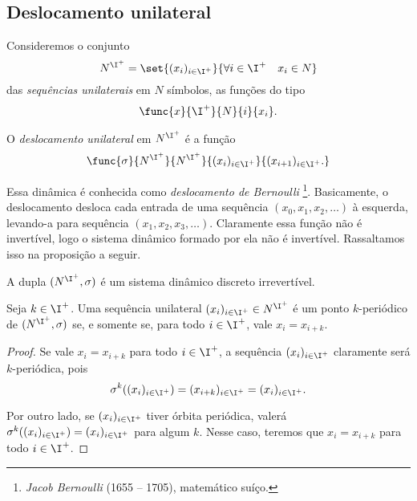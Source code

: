 \subsection{Deslocamento unilateral}

Consideremos o conjunto
	\begin{equation*}
	N^{\I^+} = \set{(x_i)_{i \in \I^+}}{\forall i \in \I^+ \quad x_i \in N}
	\end{equation*}
das \emph{sequências unilaterais} em $N$ símbolos, as funções do tipo
	\begin{align*}
	\func{x}{\I^+}{N}{i}{x_i}.
	\end{align*}

\begin{definition}
O \emph{deslocamento unilateral} em $N^{\I^+}$ é a função
	\begin{align*}
	\func{\sigma}{N^{\I^+}}{N^{\I^+}}{(x_i)_{i \in \I^+}}{(x_{i+1})_{i \in \I^+}.}
	\end{align*}
\end{definition}

 Essa dinâmica é conhecida como \emph{deslocamento de Bernoulli} \footnote{\emph{Jacob Bernoulli} (1655 -- 1705), matemático suíço.}. Basicamente, o deslocamento desloca cada entrada de uma sequência $(x_0,x_1,x_2,\ldots)$ à esquerda, levando-a para sequência $(x_1,x_2,x_3,\ldots)$. Claramente essa função não é invertível, logo o sistema dinâmico formado por ela não é invertível. Rassaltamos isso na proposição a seguir.

\begin{proposition}
A dupla $(N^{\I^+},\sigma)$ é um sistema dinâmico discreto irrevertível.
\end{proposition}

\begin{proposition}
Seja $k \in \I^+$. Uma sequência unilateral $(x_i)_{i \in \I^+} \in N^{\I^+}$ é um ponto $k$-periódico de $(N^{\I^+},\sigma)$  se, e somente se, para todo $i \in \I^+$, vale $x_i = x_{i+k}$.
\end{proposition}
\begin{proof}
Se vale $x_i = x_{i+k}$ para todo $i \in \I^+$, a sequência $(x_i)_{i \in \I^+}$ claramente será $k$-periódica, pois
	\begin{equation*}
	\sigma^k((x_i)_{i \in \I^+}) = (x_{i+k})_{i \in \I^+} = (x_i)_{i \in \I^+}.
	\end{equation*}

Por outro lado, se $(x_i)_{i \in \I^+}$ tiver órbita periódica, valerá $\sigma^k((x_i)_{i \in \I^+}) = (x_i)_{i \in \I^+}$ para algum $k$. Nesse caso, teremos que $x_i = x_{i+k}$ para todo $i \in \I^+$.
\end{proof}

